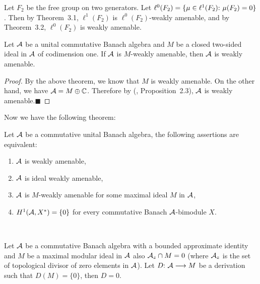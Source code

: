 \documentclass[fleqn]{mat01}
\begin{document}
Let $F_2$ be the free group on two generators. Let $\ell^0(F_2)=\{\mu\in
{\ell^1(F_2)}\hbox{:}\ \mu(F_2)=0\}$. Then by Theorem~3.1, $\ell^1(F_2)$
is $\ell^0(F_2)$-weakly amenable, and by Theorem~3.2, $\ell^0(F_2)$ is
weakly amenable.

\begin{lem}
Let $\cal A$ be a unital commutative Banach algebra and $M$ be a closed
two-sided ideal in $\cal A$ of codimension one. If $\cal A$ is
$M$\!-weakly amenable{\rm ,} then $\cal A $ is weakly amenable.
\end{lem}

\begin{proof}
By the above theorem, we know that $M$ is weakly amenable. On the other
hand, we have ${\cal A}=M\oplus\Bbb C$. Therefore by (\cite{Gr1},
Proposition~2.3), $\cal A$ is weakly amenable.\hfill $\blacksquare$
\end{proof}

Now we have the following theorem:

\begin{theor}[\!]
Let $\cal A$ be a commutative unital Banach algebra{\rm ,} the following
assertions are equivalent{\rm :}
\begin{enumerate}
\renewcommand\labelenumi{\rm (\roman{enumi})}
\leftskip .35pc
\item $\cal A$ is weakly amenable{\rm ,}

\item $\cal A$ is ideal weakly amenable{\rm ,}

\item $\cal A$ is $M$-weakly amenable for some maximal ideal $M$
in $\cal A${\rm ,}

\item $H^1({\cal A},X^*)=\{0\}$ for every commutative
Banach $\cal A$-bimodule $X$.
\end{enumerate}
\end{theor}

\begin{propo}$\left.\right.$\vspace{.5pc}

\noindent Let $\cal A$ be a commutative Banach algebra with a bounded
approximate identity and $M$ be a maximal modular ideal in $\cal A$ also
${\cal A}_z\cap M=0$ {\rm (}where ${\cal A}_z$ is the set of topological
divisor of zero elements in $\cal A${\rm )}. Let $D{\rm :}\ {\cal
A}\longrightarrow M$ be a derivation such that $D(M)=\{0\}${\rm ,} then\break 
$D=0$.
\end{propo}
\end{document}
